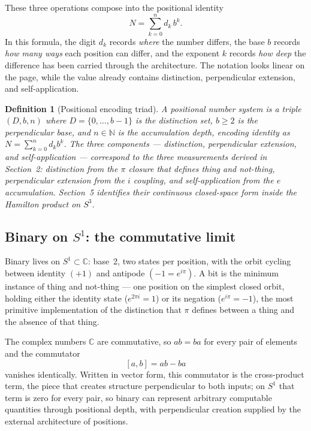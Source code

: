 \documentclass[12pt]{article}
\newtheorem{definition}[theorem]{Definition}
\begin{document}
These three operations compose into the positional identity
\[
    N = \sum_{k=0}^{n} d_k\, b^k.
\]
In this formula, the digit $d_k$ records \emph{where} the number differs, the base $b$ records \emph{how many ways} each position can differ, and the exponent $k$ records \emph{how deep} the difference has been carried through the architecture. The notation looks linear on the page, while the value already contains distinction, perpendicular extension, and self-application.

\begin{definition}[Positional encoding triad]
    A positional number system is a triple $(D,b,n)$ where $D=\{0,\ldots,b-1\}$ is the distinction set, $b\geq2$ is the perpendicular base, and $n\in\mathbb{N}$ is the accumulation depth, encoding identity as $N=\sum_{k=0}^{n}d_k b^k$. The three components --- distinction, perpendicular extension, and self-application --- correspond to the three measurements derived in Section~2: distinction from the $\pi$ closure that defines thing and not-thing, perpendicular extension from the $i$ coupling, and self-application from the $e$ accumulation. Section~5 identifies their continuous closed-space form inside the Hamilton product on $S^3$.
\end{definition}

\subsection{Binary on $S^1$: the commutative limit}

Binary lives on $S^1 \subset \mathbb{C}$: base~2, two states per position, with the orbit cycling between identity $(+1)$ and antipode $(-1=e^{i\pi})$. A bit is the minimum instance of thing and not-thing --- one position on the simplest closed orbit, holding either the identity state ($e^{2\pi i}=1$) or its negation ($e^{i\pi}=-1$), the most primitive implementation of the distinction that $\pi$ defines between a thing and the absence of that thing.

The complex numbers $\mathbb{C}$ are commutative, so $ab=ba$ for every pair of elements and the commutator
\[
    [a,b] = ab - ba
\]
vanishes identically. Written in vector form, this commutator is the cross-product term, the piece that creates structure perpendicular to both inputs; on $S^1$ that term is zero for every pair, so binary can represent arbitrary computable quantities through positional depth, with perpendicular creation supplied by the external architecture of positions.
\end{document}
